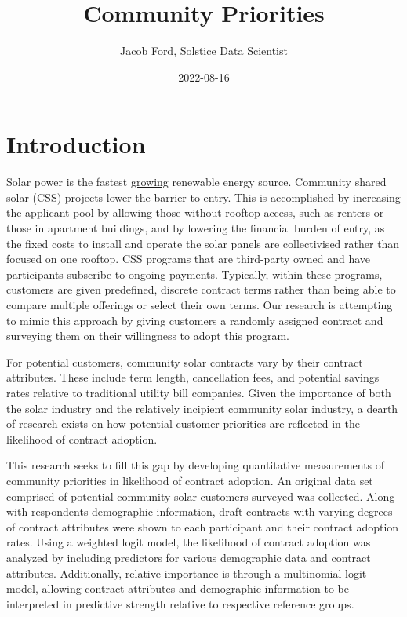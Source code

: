 \documentclass[
]{article}
\title{Community Priorities}
\author{Jacob Ford, Solstice Data Scientist}
\date{2022-08-16}
\begin{document}
\maketitle

\hypertarget{introduction}{%
\section{Introduction}\label{introduction}}

Solar power is the fastest
\href{https://www.c2es.org/content/renewable-energy/\#:~:text=Renewables\%20made\%20up\%20nearly\%2020,the\%20fastest\%2Dgrowing\%20electricity\%20source.}{growing}
renewable energy source. Community shared solar (CSS) projects lower the
barrier to entry. This is accomplished by increasing the applicant pool
by allowing those without rooftop access, such as renters or those in
apartment buildings, and by lowering the financial burden of entry, as
the fixed costs to install and operate the solar panels are
collectivised rather than focused on one rooftop. CSS programs that are
third-party owned and have participants subscribe to ongoing payments.
Typically, within these programs, customers are given predefined,
discrete contract terms rather than being able to compare multiple
offerings or select their own terms. Our research is attempting to mimic
this approach by giving customers a randomly assigned contract and
surveying them on their willingness to adopt this program.

For potential customers, community solar contracts vary by their
contract attributes. These include term length, cancellation fees, and
potential savings rates relative to traditional utility bill companies.
Given the importance of both the solar industry and the relatively
incipient community solar industry, a dearth of research exists on how
potential customer priorities are reflected in the likelihood of
contract adoption.

This research seeks to fill this gap by developing quantitative
measurements of community priorities in likelihood of contract adoption.
An original data set comprised of potential community solar customers
surveyed was collected. Along with respondents demographic information,
draft contracts with varying degrees of contract attributes were shown
to each participant and their contract adoption rates. Using a weighted
logit model, the likelihood of contract adoption was analyzed by
including predictors for various demographic data and contract
attributes. Additionally, relative importance is through a multinomial
logit model, allowing contract attributes and demographic information to
be interpreted in predictive strength relative to respective reference
groups.
\end{document}
